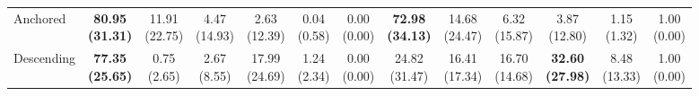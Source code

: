 {\begin{tabular}{l|cccccc|cccccc}
Anchored & \bfseries \makecell{80.95 \\ (31.31)} & \makecell{11.91 \\ (22.75)} & \makecell{4.47 \\ (14.93)} & {\cellcolor[HTML]{C8E6C9}} \makecell{2.63 \\ (12.39)} & \makecell{0.04 \\ (0.58)} & \makecell{0.00 \\ (0.00)} & \bfseries \makecell{72.98 \\ (34.13)} & \makecell{14.68 \\ (24.47)} & \makecell{6.32 \\ (15.87)} & {\cellcolor[HTML]{C8E6C9}} \makecell{3.87 \\ (12.80)} & \makecell{1.15 \\ (1.32)} & \makecell{1.00 \\ (0.00)} \\
Descending & \bfseries \makecell{77.35 \\ (25.65)} & \makecell{0.75 \\ (2.65)} & \makecell{2.67 \\ (8.55)} & {\cellcolor[HTML]{C8E6C9}} \makecell{17.99 \\ (24.69)} & \makecell{1.24 \\ (2.34)} & \makecell{0.00 \\ (0.00)} & \makecell{24.82 \\ (31.47)} & \makecell{16.41 \\ (17.34)} & \makecell{16.70 \\ (14.68)} & {\cellcolor[HTML]{C8E6C9}} \bfseries \makecell{32.60 \\ (27.98)} & \makecell{8.48 \\ (13.33)} & \makecell{1.00 \\ (0.00)} \\
\bottomrule
\end{tabular}
}%
